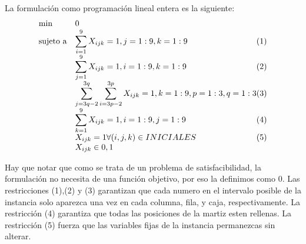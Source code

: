    
  La formulación como programación lineal entera es la siguiente:	
\begin{equation*}
\begin{array}{ll@{}ll}
\text{min}  & \displaystyle 0 &\\
\text{sujeto a} & \displaystyle\sum\limits_{i=1}^{9} X_{ijk}=1, j=1:9,k=1:9 & (1)\\
		& \displaystyle\sum\limits_{j=1}^{9} X_{ijk}=1,i=1:9,k=1:9 & (2)\\
		& \displaystyle\sum\limits_{j=3q-2}^{3q} \sum\limits_{i=3p-2}^{3p} X_{ijk}=1, k=1:9,p=1:3,q=1:3 & (3) \\
                 & \displaystyle\sum\limits_{k=1}^{9} X_{ijk}=1, i=1:9,j=1:9 & (4)\\
                 & X_{ijk}=1 \forall (i,j,k) \in INICIALES &(5) \\
                 &  X_{ijk} \in {0,1}
\end{array}
\end{equation*}

 
 Hay que notar que como se trata de un problema de satisfacibilidad, la formulación no necesita de una función objetivo, por eso la definimos como 0. Las restricciones (1),(2) y (3) garantizan que cada numero en el intervalo posible de la instancia solo aparezca una vez en cada columna, fila, y caja, respectivamente. La restricción (4) garantiza que todas las posiciones de la martiz esten rellenas. La restricción (5) fuerza que las variables fijas de la instancia permanezcas sin alterar.